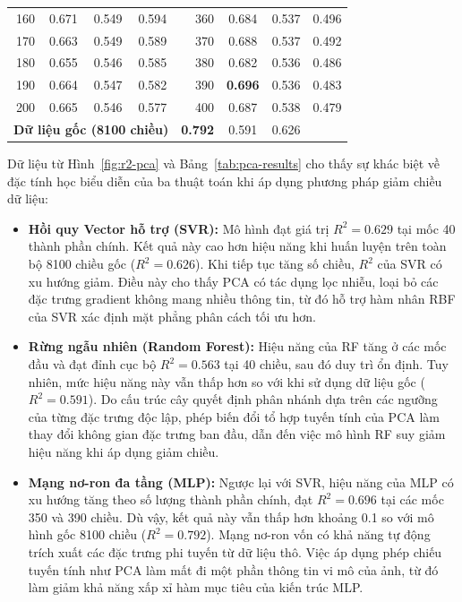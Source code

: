\begin{table}[H]
{\begin{tabular}{rccc | rccc}
            160 & 0.671 & 0.549 & 0.594 & 360 & 0.684 & 0.537 & 0.496 \\
            170 & 0.663 & 0.549 & 0.589 & 370 & 0.688 & 0.537 & 0.492 \\
            180 & 0.655 & 0.546 & 0.585 & 380 & 0.682 & 0.536 & 0.486 \\
            190 & 0.664 & 0.547 & 0.582 & 390 & \textbf{0.696} & 0.536 & 0.483 \\
            200 & 0.665 & 0.546 & 0.577 & 400 & 0.687 & 0.538 & 0.479 \\
            \midrule
            \multicolumn{4}{c|}{\textbf{Dữ liệu gốc (8100 chiều)}} & \textbf{0.792} & 0.591 & 0.626 \\
            \bottomrule
        \end{tabular}
    }
\end{table}

Dữ liệu từ Hình~\ref{fig:r2-pca} và Bảng~\ref{tab:pca-results} cho thấy sự khác biệt về đặc tính học biểu diễn của ba thuật toán khi áp dụng phương pháp giảm chiều dữ liệu:
\begin{itemize}
    \item \textbf{Hồi quy Vector hỗ trợ (SVR):} Mô hình đạt giá trị $R^2 = 0.629$ tại mốc 40 thành phần chính. Kết quả này cao hơn hiệu năng khi huấn luyện trên toàn bộ 8100 chiều gốc ($R^2 = 0.626$). Khi tiếp tục tăng số chiều, $R^2$ của SVR có xu hướng giảm. Điều này cho thấy PCA có tác dụng lọc nhiễu, loại bỏ các đặc trưng gradient không mang nhiều thông tin, từ đó hỗ trợ hàm nhân RBF của SVR xác định mặt phẳng phân cách tối ưu hơn.
    \item \textbf{Rừng ngẫu nhiên (Random Forest):} Hiệu năng của RF tăng ở các mốc đầu và đạt đỉnh cục bộ $R^2 = 0.563$ tại 40 chiều, sau đó duy trì ổn định. Tuy nhiên, mức hiệu năng này vẫn thấp hơn so với khi sử dụng dữ liệu gốc ($R^2 = 0.591$). Do cấu trúc cây quyết định phân nhánh dựa trên các ngưỡng của từng đặc trưng độc lập, phép biến đổi tổ hợp tuyến tính của PCA làm thay đổi không gian đặc trưng ban đầu, dẫn đến việc mô hình RF suy giảm hiệu năng khi áp dụng giảm chiều.
    \item \textbf{Mạng nơ-ron đa tầng (MLP):} Ngược lại với SVR, hiệu năng của MLP có xu hướng tăng theo số lượng thành phần chính, đạt $R^2 = 0.696$ tại các mốc 350 và 390 chiều. Dù vậy, kết quả này vẫn thấp hơn khoảng 0.1 so với mô hình gốc 8100 chiều ($R^2 = 0.792$). Mạng nơ-ron vốn có khả năng tự động trích xuất các đặc trưng phi tuyến từ dữ liệu thô. Việc áp dụng phép chiếu tuyến tính như PCA làm mất đi một phần thông tin vi mô của ảnh, từ đó làm giảm khả năng xấp xỉ hàm mục tiêu của kiến trúc MLP.
\end{itemize}

